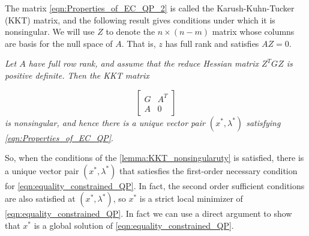 The matrix \ref{eqn:Properties_of_EC_QP_2} is called the Karush-Kuhn-Tucker (KKT) matrix, and the following result gives conditions under which it is nonsingular. We will use $Z$ to denote the $n \times (n-m)$ matrix whose columns are basis for the null space of $A$. That is, $z$ has full  rank and satisfies $AZ=0$.


\begin{lemma}
\textit{Let $A$ have full row rank, and assume that the reduce Hessian matrix $Z^TGZ$ is positive definite. Then the KKT matrix}

\begin{equation}
	\begin{bmatrix}
  		G & A^T \\
    	A & 0
    \end{bmatrix}
\label{eqn:Properties_of_EC_QP_4}	
\end{equation}
\textit{is nonsingular, and hence there is a unique vector pair $(x^*, \lambda^*)$ satisfying \ref{eqn:Properties_of_EC_QP}}.	
\label{lemma:KKT_nonsingularuty}
\end{lemma}

So, when the conditions of the \ref{lemma:KKT_nonsingularuty} is satisfied, there is a unique vector pair $(x^*, \lambda^*)$ that satiesfies the first-order necessary condition for \ref{eqn:equality_constrained_QP}. In fact, the second order sufficient conditions are also satisfied at $(x^*, \lambda^*)$, so $x^*$ is a strict local minimizer of \ref{eqn:equality_constrained_QP}. In fact we can use a direct argument to show that $x^*$ is a global solution of \ref{eqn:equality_constrained_QP}.


